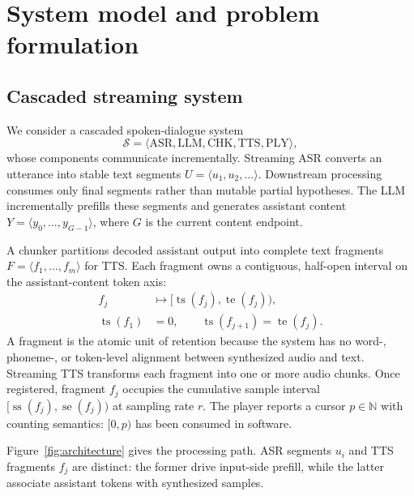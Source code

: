 \section{System model and problem formulation}
\label{sec:formulation}

\subsection{Cascaded streaming system}

We consider a cascaded spoken-dialogue system
\begin{equation}
\mathcal{S}=\langle\mathrm{ASR},\mathrm{LLM},\mathrm{CHK},\mathrm{TTS},\mathrm{PLY}\rangle,
\label{eq:system}
\end{equation}
whose components communicate incrementally. Streaming ASR converts an utterance into stable text segments $U=\langle u_1,u_2,\ldots\rangle$. Downstream processing consumes only final segments rather than mutable partial hypotheses. The LLM incrementally prefills these segments and generates assistant content $Y=\langle y_0,\ldots,y_{G-1}\rangle$, where $G$ is the current content endpoint.

A chunker partitions decoded assistant output into complete text fragments $F=\langle f_1,\ldots,f_m\rangle$ for TTS. Each fragment owns a contiguous, half-open interval on the assistant-content token axis:
\begin{align}
f_j&\mapsto[\operatorname{ts}(f_j),\operatorname{te}(f_j)), \label{eq:fragment-span}\\
\operatorname{ts}(f_1)&=0,\qquad
\operatorname{ts}(f_{j+1})=\operatorname{te}(f_j). \nonumber
\end{align}
A fragment is the atomic unit of retention because the system has no word-, phoneme-, or token-level alignment between synthesized audio and text. Streaming TTS transforms each fragment into one or more audio chunks. Once registered, fragment $f_j$ occupies the cumulative sample interval $[\operatorname{ss}(f_j),\operatorname{se}(f_j))$ at sampling rate $r$. The player reports a cursor $p\in\mathbb{N}$ with counting semantics: $[0,p)$ has been consumed in software.

Figure~\ref{fig:architecture} gives the processing path. ASR segments $u_i$ and TTS fragments $f_j$ are distinct: the former drive input-side prefill, while the latter associate assistant tokens with synthesized samples.

